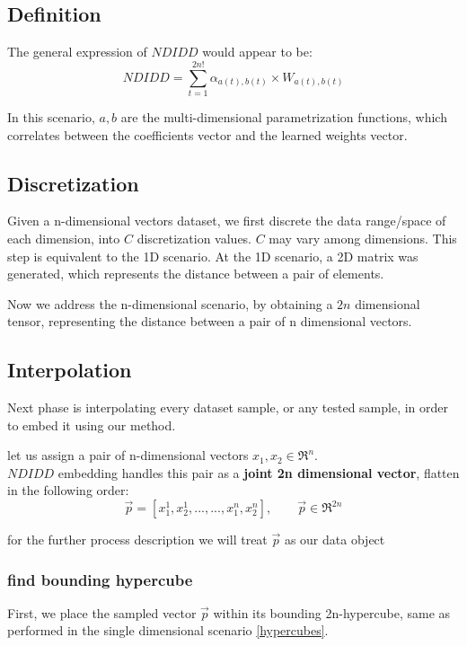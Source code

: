 	\subsection{Definition}
	
	The general expression of $NDIDD$ would appear to be:
	\begin{equation}
			NDIDD = \sum_{t=1}^{2n!}\alpha_{a(t),b(t)} \times W_{a(t),b(t)}
	\end{equation}
	
	In this scenario, $a , b$ are the multi-dimensional parametrization functions, which correlates between the coefficients vector and the learned weights vector.

		
	\subsection{Discretization}
	Given a n-dimensional vectors dataset, we first discrete the data range/space of each dimension, into $C$ discretization values. 
	$C$ may vary among dimensions. This step is equivalent to the 1D scenario.
	At the 1D scenario, a 2D matrix was generated, which represents the distance between a pair of elements.
	
	Now we address the n-dimensional scenario, by obtaining a $2n$ dimensional tensor, representing the distance between a pair of n dimensional vectors.
	
	\subsection{Interpolation}
	
	Next phase is interpolating every dataset sample, or any tested sample, in order to embed it using our method.
	
	let us assign a pair of n-dimensional vectors $x_1 , x_2 \in \Re^n$.\\
	$NDIDD$ embedding handles this pair as a \textbf{joint 2n dimensional vector}, flatten in the following order:\\
	\begin{equation}
		\overrightarrow{p} = [x_1^1 , x_2^1 , ... , ... , x_1^n , x_2^n] ,\qquad \overrightarrow{p} \in \Re^{2n}
	\end{equation}
	
	for the further process description we will treat $\overrightarrow{p}$ as our data object
	
	
		\subsubsection{find bounding hypercube}
		First, we place the sampled vector $\overrightarrow{p}$ within its bounding 2n-hypercube, same as performed in the single dimensional scenario \ref{hypercubes}.  
			
